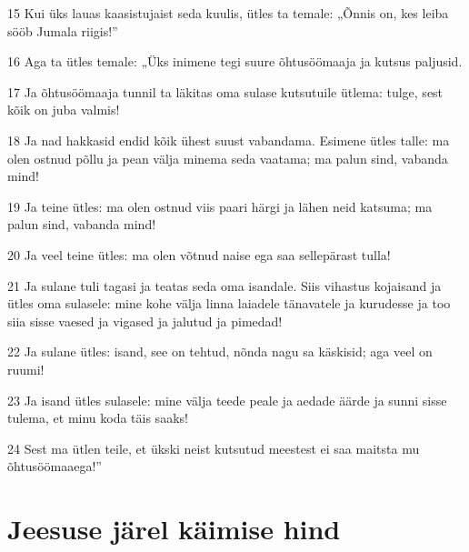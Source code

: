 \par 15 Kui üks lauas kaasistujaist seda kuulis, ütles ta temale: „Õnnis on, kes leiba sööb Jumala riigis!”
\par 16 Aga ta ütles temale: „Üks inimene tegi suure õhtusöömaaja ja kutsus paljusid.
\par 17 Ja õhtusöömaaja tunnil ta läkitas oma sulase kutsutuile ütlema: tulge, sest kõik on juba valmis!
\par 18 Ja nad hakkasid endid kõik ühest suust vabandama. Esimene ütles talle: ma olen ostnud põllu ja pean välja minema seda vaatama; ma palun sind, vabanda mind!
\par 19 Ja teine ütles: ma olen ostnud viis paari härgi ja lähen neid katsuma; ma palun sind, vabanda mind!
\par 20 Ja veel teine ütles: ma olen võtnud naise ega saa sellepärast tulla!
\par 21 Ja sulane tuli tagasi ja teatas seda oma isandale. Siis vihastus kojaisand ja ütles oma sulasele: mine kohe välja linna laiadele tänavatele ja kurudesse ja too siia sisse vaesed ja vigased ja jalutud ja pimedad!
\par 22 Ja sulane ütles: isand, see on tehtud, nõnda nagu sa käskisid; aga veel on ruumi!
\par 23 Ja isand ütles sulasele: mine välja teede peale ja aedade äärde ja sunni sisse tulema, et minu koda täis saaks!
\par 24 Sest ma ütlen teile, et ükski neist kutsutud meestest ei saa maitsta mu õhtusöömaaega!”

\section*{Jeesuse järel käimise hind}

